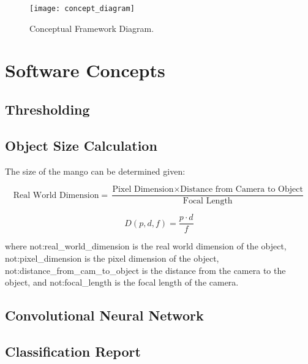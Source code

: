 \begin{figure}[!htbp]
	\centering
	\texttt{[image: concept\_diagram]}
	\caption{Conceptual Framework Diagram.}
	\label{fig:theoreticalDiagram2}
\end{figure}

\section{Software Concepts}

\subsection{Thresholding}

\subsection{Object Size Calculation}
The size of the mango can be determined given:

\begin{equation}
	\label{eq:objectSizeCalculation}
	\text{Real World Dimension} = \frac{\text{Pixel Dimension} \times \text{Distance from Camera to Object}}{\text{Focal Length}}
\end{equation}

\begin{equation} \label{eq:objectSizeCalculation2}
	\ensuremath{D \left( p, d, f \right)= \frac{p \cdot d}{f} }
\end{equation}

where \gls{not:real_world_dimension} is the real world dimension of the object,
 \gls{not:pixel_dimension} is the pixel dimension of the object, 
 \gls{not:distance_from_cam_to_object} is the distance from the camera to the object,
  and \gls{not:focal_length} is the focal length of the camera.

\subsection{Convolutional Neural Network}

\subsection{Classification Report}

